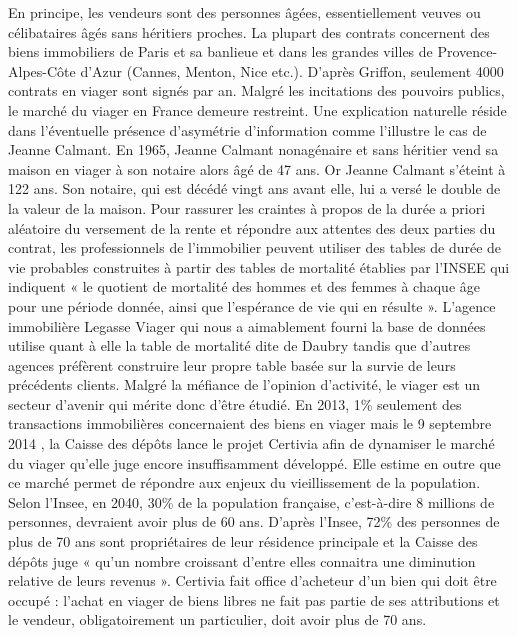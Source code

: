 \documentclass[12pt,a4paper]{article}
\begin{document}
 En principe, les vendeurs sont des personnes âgées, essentiellement veuves ou célibataires âgés sans héritiers proches. La plupart des contrats concernent des biens immobiliers de Paris et sa banlieue et dans les grandes villes de Provence-Alpes-Côte d’Azur (Cannes, Menton, Nice etc.). D’après Griffon, seulement 4000 contrats en viager sont signés par an. Malgré les incitations des pouvoirs publics, le marché du viager en France demeure restreint. Une explication naturelle réside dans l’éventuelle présence d’asymétrie d’information comme l’illustre le cas de Jeanne Calmant. En 1965, Jeanne Calmant nonagénaire et sans héritier vend sa maison en viager à son notaire alors âgé de 47 ans. Or Jeanne Calmant s’éteint à 122 ans. Son notaire, qui est décédé vingt ans avant elle, lui a versé le double de la valeur de la maison. Pour rassurer les craintes à propos de la durée a priori aléatoire du versement de la rente et répondre aux attentes des deux parties du contrat, les professionnels de l’immobilier peuvent utiliser des tables de durée de vie probables construites à partir des  tables de mortalité  établies par l’INSEE qui indiquent  « le quotient de mortalité des hommes et des femmes à chaque âge pour une période donnée, ainsi que l’espérance de vie qui en résulte ». L’agence immobilière Legasse Viager qui nous a aimablement fourni la base de données utilise quant à elle la table de mortalité dite de Daubry tandis que d’autres agences préfèrent construire leur propre table basée sur la survie de leurs précédents clients.
Malgré la méfiance de l’opinion d’activité, le viager est un secteur d’avenir qui mérite donc d’être étudié. En 2013, 1\% seulement des transactions immobilières concernaient des biens en viager mais le 9 septembre 2014 , la Caisse des dépôts lance le projet Certivia afin de dynamiser le marché du viager qu’elle juge encore insuffisamment développé. Elle estime en outre que ce marché permet de répondre aux enjeux du vieillissement de la population. Selon l’Insee, en 2040, 30\% de la population française, c’est-à-dire 8 millions de personnes, devraient avoir plus de 60 ans. D’après l’Insee, 72\% des personnes de plus de 70 ans sont propriétaires de leur résidence principale et la Caisse des dépôts juge  « qu’un nombre croissant d’entre elles connaitra une diminution relative de leurs revenus ». Certivia fait office d’acheteur d’un bien qui doit être occupé : l’achat en viager de biens  libres ne fait pas partie de ses attributions et  le vendeur, obligatoirement un particulier, doit avoir plus de 70 ans. 
\end{document}
